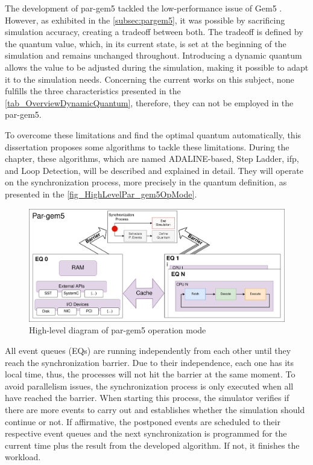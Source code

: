 
The development of par-gem5 \cite{pargem5} tackled the low-performance issue of Gem5 \cite{TheGem5Simulator}. However, as exhibited in the 
\autoref{subsec:pargem5}, it was possible by sacrificing simulation accuracy, creating a tradeoff between both. 
The tradeoff is defined by the quantum value, which, in its current state, is set at the beginning of the simulation and remains unchanged 
throughout. Introducing a dynamic quantum allows the value to be adjusted during the simulation, making it possible to adapt it to the 
simulation needs. Concerning the current works on this subject, none fulfills the three characteristics presented in the 
\autoref{tab_OverviewDynamicQuantum}, therefore, they can not be employed in the par-gem5. 

To overcome these limitations and find the optimal quantum automatically, this dissertation proposes some algorithms to tackle these limitations.   
During the chapter, these algorithms, which are named ADALINE-based, Step Ladder, \gls{ifp}, and Loop Detection, will be described 
and explained in detail. They will operate on the synchronization process, more precisely in the quantum definition, as presented 
in the \autoref{fig_HighLevelPar_gem5OpMode}.

\begin{figure}[]
	\centering
 	\includegraphics[width=0.8\linewidth]{Images/HighLevelPar_gem5OpMode.png}
 	\caption{High-level diagram of par-gem5 operation mode}
	\label{fig_HighLevelPar_gem5OpMode}
\end{figure}


All event queues (EQs) are running independently from each other until they reach the synchronization barrier. 
Due to their independence, each one has its local time, thus, the processes will not hit the barrier at the same moment. 
To avoid parallelism issues, the synchronization process is only executed when all have reached the barrier. When starting this 
process, the simulator verifies if there are more events to carry out and establishes whether the simulation should continue or not.
If affirmative, the postponed events are scheduled to their respective event queues and the next synchronization is programmed for 
the current time plus the result from the developed algorithm. If not, it finishes the workload.

